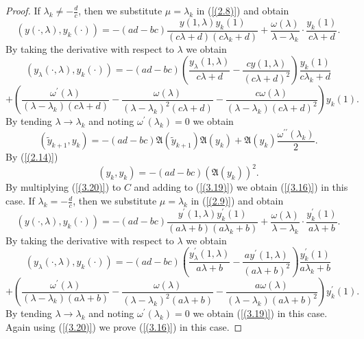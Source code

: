 \documentclass[pdflatex,sn-mathphys-num]{sn-jnl}%
\theoremstyle{thmstyleone}%
\theoremstyle{thmstyletwo}%
\theoremstyle{thmstylethree}%
\theoremstyle{definition}
\theoremstyle{remark}
\numberwithin{equation}{section}
\begin{document}
\begin{proof}
If $\lambda_k\neq-\frac{d}{c}$, then we substitute $\mu=\lambda_k$ in (\ref{(2.8)}) and obtain 
\begin{equation}
\left(y(\cdot,\lambda), y_k(\cdot)\right)
= -(ad - bc)\frac{y(1,\lambda){y_k(1)}}{(c\lambda + d)(c{\lambda_k} + d)}+ \frac{\omega(\lambda)}{\lambda - {\lambda_k}} \cdot \frac{{y_k(1)}}{c\lambda + d}.\label{(3.17)}
\end{equation}
By taking the derivative with respect to $\lambda$ we obtain
$$
\left(y_\lambda(\cdot,\lambda), y_k(\cdot)\right)
= -(ad - bc)\left(\frac{y_\lambda{(1,\lambda)}}{c\lambda + d}-\frac{cy{(1,\lambda)}}{(c\lambda + d)^2}\right)\frac{{y_k(1)}}{c{\lambda_k} + d}
$$
\begin{equation}
    +\left(\frac{\omega^\prime(\lambda)}{(\lambda-\lambda_k)(c\lambda + d)}-\frac{\omega(\lambda)}{(\lambda-\lambda_k)^2(c\lambda + d)}-\frac{c\omega(\lambda)}{(\lambda-\lambda_k)(c\lambda + d)^2}\right)y_k(1).\label{(3.18)}
\end{equation}
By tending $\lambda\to\lambda_k$ and noting $\omega^\prime(\lambda_k)=0$ we obtain 
\begin{equation}
\left( \tilde{y}_{k + 1},y_{k} \right) = - (ad - bc)\mathfrak{A}(\tilde{y}_{k+1})\mathfrak{A}(y_{k})+\mathfrak{A}(y_k)\frac{\omega^{\prime\prime}(\lambda_k)}{2}. \label{(3.19)}
\end{equation}
By (\ref{(2.14)}) 
\begin{equation}
\left( {y}_{k},y_{k} \right) = - (ad - bc)(\mathfrak{A}(y_{k}))^2. \label{(3.20)}
\end{equation}
By multiplying (\ref{(3.20)}) to $C$ and adding to (\ref{(3.19)}) we obtain (\ref{(3.16)}) in this case.
If $\lambda_k=-\frac{d}{c}$, then we substitute $\mu=\lambda_k$ in (\ref{(2.9)}) and obtain 
\begin{equation}
\left(y(\cdot,\lambda), y_k(\cdot)\right)
= -(ad - bc)\frac{y^\prime(1,\lambda){y^\prime_k(1)}}{(a\lambda + b)(a{\lambda_k} + b)}+ \frac{\omega(\lambda)}{\lambda - {\lambda_k}} \cdot \frac{{y^\prime_k(1)}}{a\lambda + b}.\label{(3.21)}
\end{equation}
By taking the derivative with respect to $\lambda$ we obtain
$$
\left(y_\lambda(\cdot,\lambda), y_k(\cdot)\right)
= -(ad - bc)\left(\frac{y^\prime_\lambda{(1,\lambda)}}{a\lambda + b}-\frac{ay^\prime{(1,\lambda)}}{(a\lambda + b)^2}\right)\frac{{y^\prime_k(1)}}{a{\lambda_k} + b}
$$
\begin{equation}
    +\left(\frac{\omega^\prime(\lambda)}{(\lambda-\lambda_k)(a\lambda + b)}-\frac{\omega(\lambda)}{(\lambda-\lambda_k)^2(a\lambda + b)}-\frac{a\omega(\lambda)}{(\lambda-\lambda_k)(a\lambda + b)^2}\right)y^\prime_k(1).\label{(3.22)}
\end{equation}
By tending $\lambda\to\lambda_k$ and noting $\omega^\prime(\lambda_k)=0$ we obtain (\ref{(3.19)}) in this case. Again using (\ref{(3.20)}) we prove (\ref{(3.16)}) in this case.
\end{proof}
\end{document}
